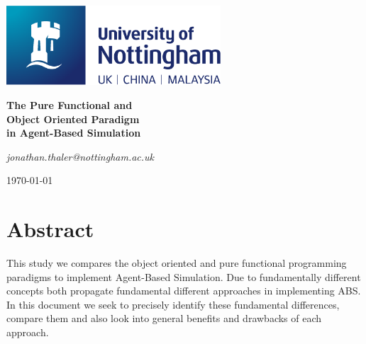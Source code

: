 \documentclass[oneside]{book}
\begin{document}
\begin{titlepage}
	\centering
	\includegraphics[width=0.60\textwidth]{../../logo/UoN_Primary_Logo_RGB.png}\par\vspace{1cm}
	\vspace{1.5cm}
	{\huge\bfseries The Pure Functional and \\ Object Oriented Paradigm \\ in Agent-Based Simulation \par}
	\vspace{2cm}
	{\Large\itshape jonathan.thaler@nottingham.ac.uk \par}
	\vfill
	
	\vfill

	{\large \today\par}
\end{titlepage}

\cleardoublepage

\section*{Abstract}
This study we compares the object oriented and pure functional programming paradigms to implement Agent-Based Simulation. Due to fundamentally different concepts both propagate fundamental different approaches in implementing ABS. In this document we seek to precisely identify these fundamental differences, compare them and also look into general benefits and drawbacks of each approach.

\clearpage
\tableofcontents
\clearpage









\renewcommand\bibname{References}



\end{document}
